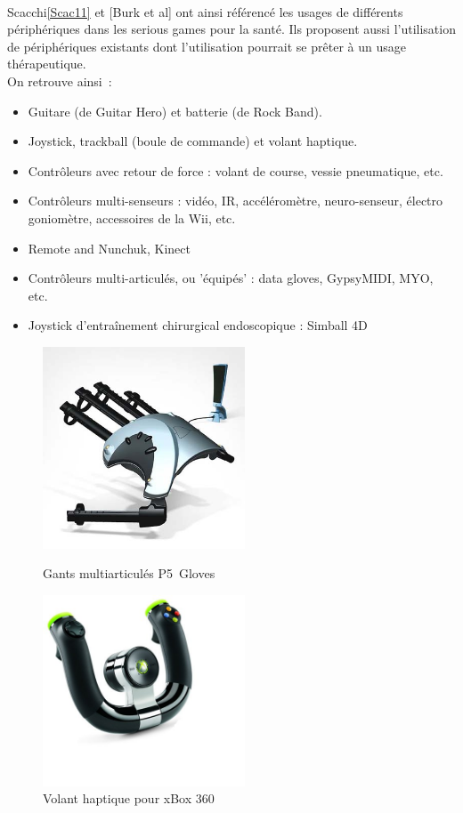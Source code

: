 \paragraph{} Scacchi\ref{Scac11} et [Burk et al]\cite{Burk09} ont ainsi référencé les usages de différents périphériques dans les serious games pour la santé. Ils proposent aussi l'utilisation de périphériques existants dont l'utilisation pourrait se prêter à un usage thérapeutique. \\
On retrouve ainsi~:
\begin{itemize}
	\item Guitare (de Guitar Hero) et batterie (de Rock Band).
	\item Joystick, trackball (boule de commande) et volant haptique.
	\item Contrôleurs avec retour de force : volant de course, vessie pneumatique, etc.
	\item Contrôleurs multi-senseurs : vidéo, IR, accéléromètre, neuro-senseur, électro goniomètre, accessoires de la Wii, etc.
	\item Remote and Nunchuk, Kinect
	\item Contrôleurs multi-articulés, ou 'équipés' : data gloves, GypsyMIDI, MYO, etc.
	\item Joystick d’entraînement chirurgical endoscopique : Simball 4D
\end{itemize}

\begin{figure}
	\begin{minipage}{0.49\linewidth}
		\centering
		\includegraphics[width=6cm]{images/p5_gloves.jpg}
		\caption{Gants multiarticulés P5~Gloves}
		\label{p5gloves}
	\end{minipage}
	\begin{minipage}{0.49\linewidth}
		\centering
		\includegraphics[width=6cm]{images/volant_haptique.jpg}
		\caption{Volant haptique pour xBox 360}
		\label{volant_haptique}
	\end{minipage}
\end{figure}

